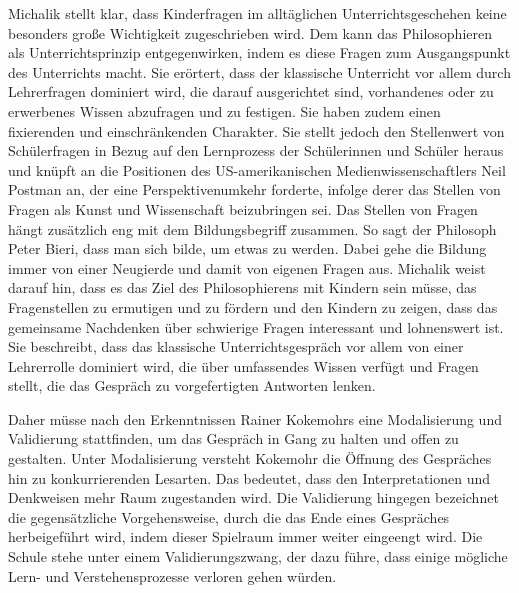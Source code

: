 Michalik stellt klar, dass Kinderfragen im alltäglichen Unterrichtsgeschehen keine besonders große Wichtigkeit zugeschrieben wird. 
Dem kann das Philosophieren als Unterrichtsprinzip entgegenwirken, indem es diese Fragen zum Ausgangspunkt des Unterrichts macht. 
Sie erörtert, dass der klassische Unterricht vor allem durch Lehrerfragen dominiert wird, die darauf ausgerichtet sind, vorhandenes oder zu erwerbenes Wissen abzufragen und zu festigen. 
Sie haben zudem einen \glqq fixierenden und einschränkenden Charakter\grqq{}\cite[S.\,635]{KM13}. 
Sie stellt jedoch den Stellenwert von Schülerfragen in Bezug auf den Lernprozess der Schülerinnen und Schüler heraus und knüpft an die Positionen des US-amerikanischen Medienwissenschaftlers Neil Postman an, der eine Perspektivenumkehr forderte, infolge derer das Stellen von Fragen als \glqq Kunst und Wissenschaft beizubringen\grqq{}\cite[S.\,636]{KM13} sei. 
Das Stellen von Fragen hängt zusätzlich eng mit dem Bildungsbegriff zusammen. 
So sagt der Philosoph Peter Bieri, dass man sich bilde, um etwas zu werden. 
Dabei gehe die Bildung immer von einer Neugierde und damit von eigenen Fragen aus.
Michalik weist darauf hin, dass es das Ziel des Philosophierens mit Kindern sein müsse, \glqq das Fragenstellen zu ermutigen und zu fördern und den Kindern zu zeigen, dass das gemeinsame Nachdenken über schwierige Fragen interessant und lohnenswert ist.\grqq{}\cite[S.\,637]{KM13}
Sie beschreibt, dass das klassische Unterrichtsgespräch vor allem von einer Lehrerrolle dominiert wird, die über umfassendes Wissen verfügt und Fragen stellt, die das Gespräch zu vorgefertigten Antworten lenken.

Daher müsse nach den Erkenntnissen Rainer Kokemohrs eine Modalisierung und Validierung stattfinden, um das Gespräch in Gang zu halten und offen zu gestalten.
Unter Modalisierung versteht Kokemohr \glqq die Öffnung des Gespräches hin zu konkurrierenden Lesarten.\grqq{}\cite[S.\,637]{KM13}
Das bedeutet, dass den Interpretationen und Denkweisen mehr Raum zugestanden wird.
Die Validierung hingegen bezeichnet die gegensätzliche Vorgehensweise, durch die das Ende eines Gespräches herbeigeführt wird, indem dieser Spielraum immer weiter eingeengt wird.
Die Schule stehe unter einem Validierungszwang, der dazu führe, dass einige mögliche Lern- und Verstehensprozesse verloren gehen würden.
 
